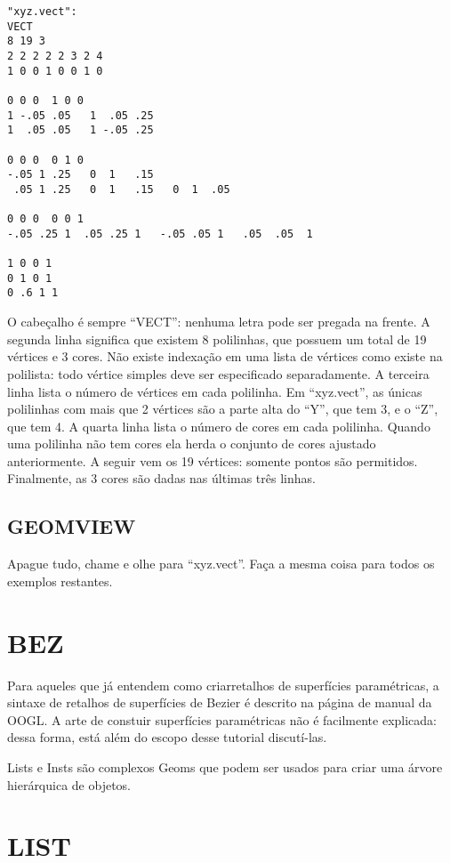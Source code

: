 \documentclass[12pt,a4paper]{book}
\begin{document}
\begin{verbatim}
"xyz.vect":
VECT
8 19 3
2 2 2 2 2 3 2 4 
1 0 0 1 0 0 1 0

0 0 0  1 0 0
1 -.05 .05   1  .05 .25
1  .05 .05   1 -.05 .25

0 0 0  0 1 0
-.05 1 .25   0  1   .15
 .05 1 .25   0  1   .15   0  1  .05

0 0 0  0 0 1
-.05 .25 1  .05 .25 1   -.05 .05 1   .05  .05  1

1 0 0 1
0 1 0 1
0 .6 1 1
\end{verbatim}

O cabe\c{c}alho \'e sempre ``VECT'': nenhuma letra pode ser pregada na frente.
A segunda linha significa que existem 8 polilinhas, que possuem um total
de 19 v\'ertices e 3 cores. N\~ao existe indexa\c{c}\~ao em uma lista de
v\'ertices como existe na polilista: todo v\'ertice simples deve ser especificado
separadamente. A terceira linha lista o n\'umero de v\'ertices em cada
polilinha. Em ``xyz.vect'', as \'unicas polilinhas com mais que 2 v\'ertices
s\~ao a parte alta do ``Y'', que tem 3, e o ``Z'', que tem 4.
A quarta linha lista o n\'umero de cores em cada polilinha.  Quando uma
polilinha n\~ao tem cores ela herda o conjunto de cores ajustado anteriormente.  A seguir
vem os 19 v\'ertices: somente pontos s\~ao permitidos. Finalmente, as 3 cores
s\~ao dadas nas \'ultimas tr\^es linhas.

\section{GEOMVIEW} 

Apague tudo, chame e olhe para ``xyz.vect''. Fa\c{c}a a mesma coisa para
todos os exemplos restantes.

\chapter{BEZ}

Para aqueles que j\'a entendem como criarretalhos de superf\'icies
param\'etricas, a sintaxe de retalhos de superf\'icies de Bezier \'e descrito na p\'agina de manual
da OOGL.  A arte de constuir superf\'icies param\'etricas n\~ao \'e facilmente
explicada: dessa forma, est\'a al\'em do escopo desse tutorial discut\'i-las.

Lists e Insts s\~ao complexos Geoms que podem ser usados para criar uma
\'arvore hier\'arquica de objetos. 

\chapter{LIST}
\end{document}
